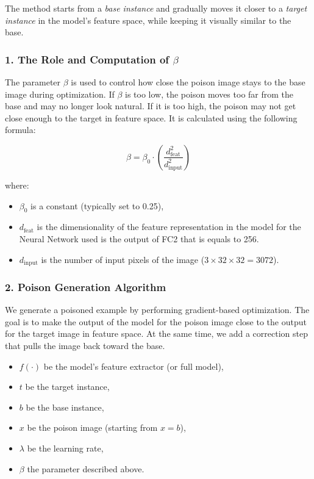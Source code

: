 The method starts from a \textit{base instance} and gradually moves it closer to a \textit{target instance} in the model's feature space, while keeping it visually similar to the base.

\subsubsection*{1. The Role and Computation of $\beta$}

The parameter $\beta$ is used to control how close the poison image stays to the base image during optimization. If $\beta$ is too low, the poison moves too far from the base and may no longer look natural. If it is too high, the poison may not get close enough to the target in feature space.
It is calculated using the following formula:

\[
\beta = \beta_0 \cdot \left( \frac{d_{\text{feat}}^2}{d_{\text{input}}^2} \right)
\]

where:
\begin{itemize}
    \item $\beta_0$ is a constant (typically set to 0.25),
    \item $d_{\text{feat}}$ is the dimensionality of the feature representation in the model for the Neural Network used is the output of FC2 that is equals to 256.
    \item $d_{\text{input}}$ is the number of input pixels of the image ($3 \times 32 \times 32 = 3072$).
\end{itemize}

\subsubsection*{2. Poison Generation Algorithm}

We generate a poisoned example by performing gradient-based optimization. The goal is to make the output of the model for the poison image close to the output for the target image in feature space. At the same time, we add a correction step that pulls the image back toward the base.

\begin{itemize}
    \item $f(\cdot)$ be the model’s feature extractor (or full model),
    \item $t$ be the target instance,
    \item $b$ be the base instance,
    \item $x$ be the poison image (starting from $x = b$),
    \item $\lambda$ be the learning rate,
    \item $\beta$ the parameter described above.
\end{itemize}

